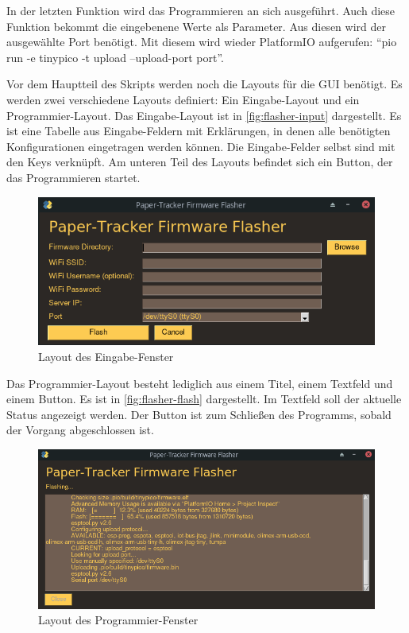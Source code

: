 In der letzten Funktion wird das Programmieren an sich ausgeführt.
Auch diese Funktion bekommt die eingebenene Werte als Parameter. Aus diesen wird der ausgewählte Port benötigt.
Mit diesem wird wieder PlatformIO aufgerufen: \enquote{pio run -e tinypico -t upload --upload-port port}.

Vor dem Hauptteil des Skripts werden noch die Layouts für die \gls{GUI} benötigt.
Es werden zwei verschiedene Layouts definiert: Ein Eingabe-Layout und ein Programmier-Layout.
Das Eingabe-Layout ist in \autoref{fig:flasher-input} dargestellt.
Es ist eine Tabelle aus Eingabe-Feldern mit Erklärungen, in denen alle benötigten Konfigurationen eingetragen werden können.
Die Eingabe-Felder selbst sind mit den Keys verknüpft.
Am unteren Teil des Layouts befindet sich ein Button, der das Programmieren startet.

\begin{figure}[htbp]
	\includegraphics[width=\textwidth]{images/flasher/input.png}
	\centering
	\caption{Layout des Eingabe-Fenster}
	\label{fig:flasher-input}
\end{figure}

Das Programmier-Layout besteht lediglich aus einem Titel, einem Textfeld und einem Button.
Es ist in \autoref{fig:flasher-flash} dargestellt.
Im Textfeld soll der aktuelle Status angezeigt werden.
Der Button ist zum Schließen des Programms, sobald der Vorgang abgeschlossen ist.

\begin{figure}[htbp]
	\includegraphics[width=\textwidth]{images/flasher/flash.png}
	\centering
	\caption{Layout des Programmier-Fenster}
	\label{fig:flasher-flash}
\end{figure}

